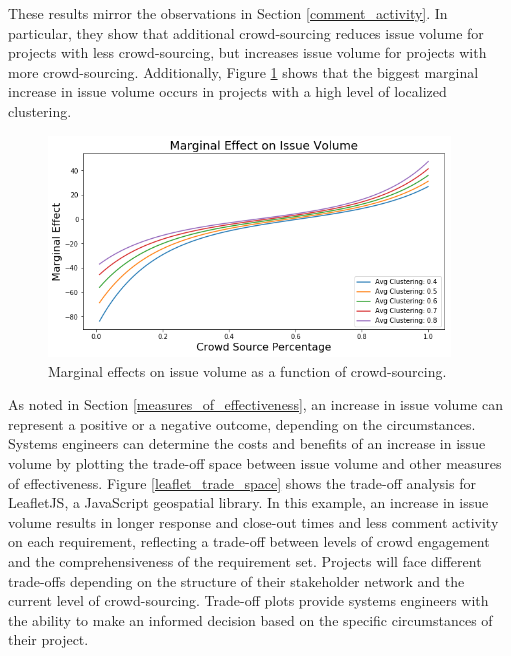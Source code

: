 These results mirror the observations in Section \ref{comment_activity}. In particular, they show that additional crowd-sourcing reduces issue volume for projects with less crowd-sourcing, but increases issue volume for projects with more crowd-sourcing. Additionally, Figure \ref{issue_volume_marginal} shows that the biggest marginal increase in issue volume occurs in projects with a high level of localized clustering. 

\begin{figure}
  \includegraphics[width=0.95\textwidth]{issue_volume_marginal.PNG}
\caption{Marginal effects on issue volume as a function of crowd-sourcing.}
\label{issue_volume_marginal}
\end{figure}

As noted in Section \ref{measures_of_effectiveness}, an increase in issue volume can represent a positive or a negative outcome, depending on the circumstances. Systems engineers can determine the costs and benefits of an increase in issue volume by plotting the trade-off space between issue volume and other measures of effectiveness. Figure \ref{leaflet_trade_space} shows the trade-off analysis for LeafletJS, a JavaScript geospatial library. In this example, an increase in issue volume results in longer response and close-out times and less comment activity on each requirement, reflecting a trade-off between levels of crowd engagement and the comprehensiveness of the requirement set. Projects will face different trade-offs depending on the structure of their stakeholder network and the current level of crowd-sourcing. Trade-off plots provide systems engineers with the ability to make an informed decision based on the specific circumstances of their project.

